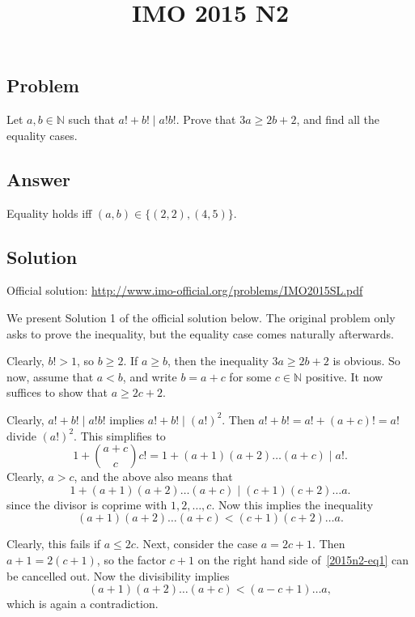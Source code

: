 \documentclass{article}
\title{IMO 2015 N2}
\author{}
\date{}
\newcommand{\N}{\mathbb{N}}
\begin{document}
\maketitle



\subsection*{Problem}

Let $a, b \in \N$ such that $a! + b! \mid a! b!$.
Prove that $3a \geq 2b + 2$, and find all the equality cases.



\subsection*{Answer}

Equality holds iff $(a, b) \in \{(2, 2), (4, 5)\}$.



\subsection*{Solution}

Official solution: \url{http://www.imo-official.org/problems/IMO2015SL.pdf}

We present Solution 1 of the official solution below.
The original problem only asks to prove the inequality, but the equality case comes naturally afterwards.

Clearly, $b! > 1$, so $b \geq 2$.
If $a \geq b$, then the inequality $3a \geq 2b + 2$ is obvious.
So now, assume that $a < b$, and write $b = a + c$ for some $c \in \N$ positive.
It now suffices to show that $a \geq 2c + 2$.

Clearly, $a! + b! \mid a! b!$ implies $a! + b! \mid (a!)^2$.
Then $a! + b! = a! + (a + c)! = a!$ divide $(a!)^2$.
This simplifies to
\[ 1 + \binom{a + c}{c} c! = 1 + (a + 1)(a + 2) \ldots (a + c) \mid a!. \]
Clearly, $a > c$, and the above also means that
\[ 1 + (a + 1)(a + 2) \ldots (a + c) \mid (c + 1)(c + 2) \ldots a. \tag{1}\label{2015n2-eq1} \]
    since the divisor is coprime with $1, 2, \ldots, c$.
Now this implies the inequality
\[ (a + 1)(a + 2) \ldots (a + c) < (c + 1)(c + 2) \ldots a. \]

Clearly, this fails if $a \leq 2c$.
Next, consider the case $a = 2c + 1$.
Then $a + 1 = 2(c + 1)$, so the factor $c + 1$ on the right hand side of~\eqref{2015n2-eq1} can be cancelled out.
Now the divisibility implies
\[ (a + 1)(a + 2) \ldots (a + c) < (a - c + 1) \ldots a, \]
    which is again a contradiction.
\end{document}
